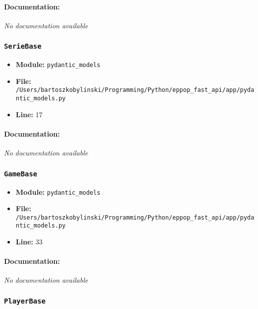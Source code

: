 \documentclass[11pt,a4paper]{article}
\begin{document}
\paragraph{Documentation:} \textit{No documentation available}


\vspace{1em}
\subsubsection{\texttt{SerieBase}}

\begin{itemize}
    \item \textbf{Module:} \texttt{pydantic\_models}
    \item \textbf{File:} \texttt{/Users/bartoszkobylinski/Programming/Python/eppop\_fast\_api/app/pydantic\_models.py}
    \item \textbf{Line:} 17
\end{itemize}

\paragraph{Documentation:} \textit{No documentation available}


\vspace{1em}
\subsubsection{\texttt{GameBase}}

\begin{itemize}
    \item \textbf{Module:} \texttt{pydantic\_models}
    \item \textbf{File:} \texttt{/Users/bartoszkobylinski/Programming/Python/eppop\_fast\_api/app/pydantic\_models.py}
    \item \textbf{Line:} 33
\end{itemize}

\paragraph{Documentation:} \textit{No documentation available}


\vspace{1em}
\subsubsection{\texttt{PlayerBase}}
\end{document}
